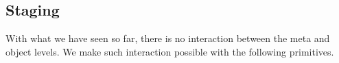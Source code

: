 \documentclass[acmsmall,screen]{acmart}
\newcommand{\mbf}[1]{{\mathbf{#1}}}
\theoremstyle{remark}
\begin{document}



\subsection{Staging}\label{sec:staging}

With what we have seen so far, there is no interaction between the meta and
object levels. We make such interaction possible with the following primitives.
\end{document}
